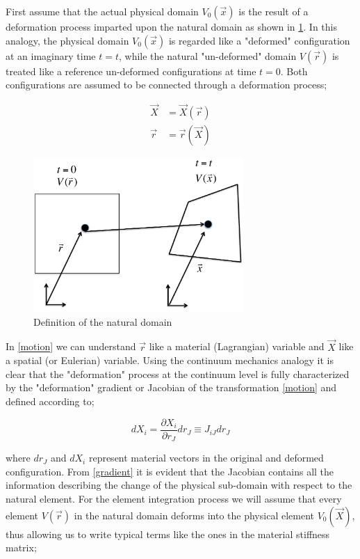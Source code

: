 First assume that the actual physical domain $V_0(\vec{x})$ is the result of a deformation process imparted upon the natural domain as shown in \cref{fig:natural domain}. In this analogy, the physical domain $V_0(\vec{x})$ is regarded like a "deformed" configuration at an imaginary time $t=t$, while the natural "un-deformed" domain $V(\vec{r})$   is treated like a reference un-deformed configurations at time $t=0$. Both configurations are assumed to be connected through a deformation process;


\begin{equation}
\begin{aligned}
\vec{X}&=\vec{X}(\vec{r})\\
\vec{r}&=\vec{r}(\vec{X})
\end{aligned}
\label{motion}
\end{equation}

\begin{figure}[h]
\centering
\includegraphics[width=8cm]{img/figure1.pdf}
\caption{Definition of the natural domain}
\label{fig:natural domain}
\end{figure}

 

In \cref{motion} we can understand $\vec{r}$ like a material (Lagrangian) variable and $\vec{X}$ like a spatial (or Eulerian) variable. Using the continuum mechanics analogy it is clear that the "deformation" process at the continuum level is fully characterized by the "deformation" gradient or Jacobian of the transformation \cref{motion} and defined according to;

\begin{equation}
dX_i=\dfrac{\partial X_i}{\partial r_J}dr_J\equiv J_{iJ}dr_{J}
\label{gradient}
\end{equation}

where $dr_{J}$ and $dX_i$ represent material vectors in the original and deformed configuration. From \cref{gradient} it is evident that the Jacobian contains all the information describing the change of the physical sub-domain with respect to the natural element. For the element integration process we will assume that every element $V(\vec{r})$ in the natural domain deforms into the physical element $V_0(\vec{X})$, thus allowing us to write typical terms like the ones in the material stiffness matrix;

